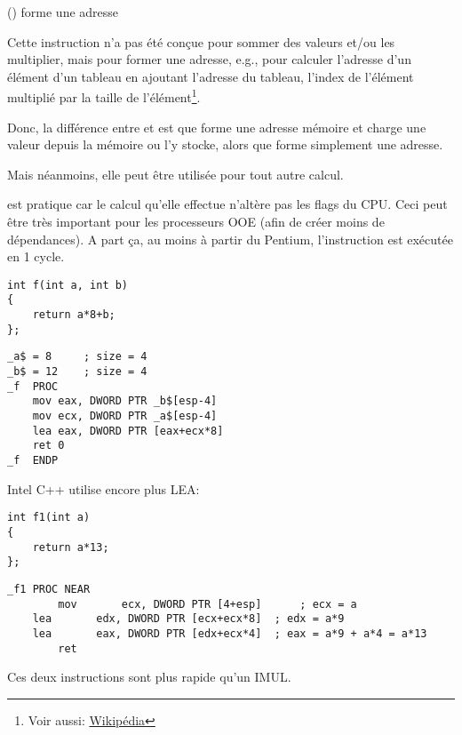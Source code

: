 \item[LEA] () forme une adresse

\label{sec:LEA}

\newcommand{\URLAM}{\href{http://go.yurichev.com/17109}{Wikipédia}}

Cette instruction n'a pas été conçue pour sommer des valeurs et/ou les multiplier,
mais pour former une adresse, e.g., pour calculer l'adresse d'un élément d'un tableau
en ajoutant l'adresse du tableau, l'index de l'élément multiplié par la taille de
l'élément\footnote{Voir aussi: \URLAM}.
\par
Donc, la différence entre \MOV et \LEA est que \MOV forme une adresse mémoire et
charge une valeur depuis la mémoire ou l'y stocke, alors que \LEA forme simplement une adresse.
\par
Mais néanmoins, elle peut être utilisée pour tout autre calcul.
\par
\LEA est pratique car le calcul qu'elle effectue n'altère pas les flags du \ac{CPU}.
Ceci peut être très important pour les processeurs \ac{OOE} (afin de créer moins de dépendances).
A part ça, au moins à partir du Pentium, l'instruction \LEA est exécutée en 1 cycle.

\begin{lstlisting}[style=customc]
int f(int a, int b)
{
	return a*8+b;
};
\end{lstlisting}

\begin{lstlisting}[caption=MSVC 2010 \Optimizing,style=customasmx86]
_a$ = 8		; size = 4
_b$ = 12	; size = 4
_f	PROC
	mov	eax, DWORD PTR _b$[esp-4]
	mov	ecx, DWORD PTR _a$[esp-4]
	lea	eax, DWORD PTR [eax+ecx*8]
	ret	0
_f	ENDP
\end{lstlisting}

Intel C++ utilise encore plus LEA:

\begin{lstlisting}[style=customc]
int f1(int a)
{
	return a*13;
};
\end{lstlisting}

\begin{lstlisting}[caption=Intel C++ 2011,style=customasmx86]
_f1	PROC NEAR
        mov       ecx, DWORD PTR [4+esp]      ; ecx = a
	lea       edx, DWORD PTR [ecx+ecx*8]  ; edx = a*9
	lea       eax, DWORD PTR [edx+ecx*4]  ; eax = a*9 + a*4 = a*13
        ret
\end{lstlisting}

Ces deux instructions sont plus rapide qu'un IMUL.

